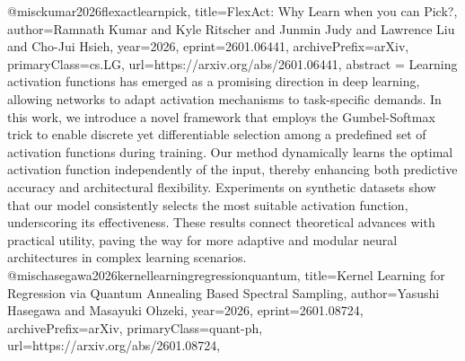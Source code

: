 {}@misc{kumar2026flexactlearnpick,
      title={FlexAct: Why Learn when you can Pick?}, 
      author={Ramnath Kumar and Kyle Ritscher and Junmin Judy and Lawrence Liu and Cho-Jui Hsieh},
      year={2026},
      eprint={2601.06441},
      archivePrefix={arXiv},
      primaryClass={cs.LG},
      url={https://arxiv.org/abs/2601.06441},
      abstract = {Learning activation functions has emerged as a promising direction in deep learning, allowing networks to adapt activation mechanisms to task-specific demands. In this work, we introduce a novel framework that employs the Gumbel-Softmax trick to enable discrete yet differentiable selection among a predefined set of activation functions during training. Our method dynamically learns the optimal activation function independently of the input, thereby enhancing both predictive accuracy and architectural flexibility. Experiments on synthetic datasets show that our model consistently selects the most suitable activation function, underscoring its effectiveness. These results connect theoretical advances with practical utility, paving the way for more adaptive and modular neural architectures in complex learning scenarios.}
}@misc{hasegawa2026kernellearningregressionquantum,
      title={Kernel Learning for Regression via Quantum Annealing Based Spectral Sampling}, 
      author={Yasushi Hasegawa and Masayuki Ohzeki},
      year={2026},
      eprint={2601.08724},
      archivePrefix={arXiv},
      primaryClass={quant-ph},
      url={https://arxiv.org/abs/2601.08724},
}
